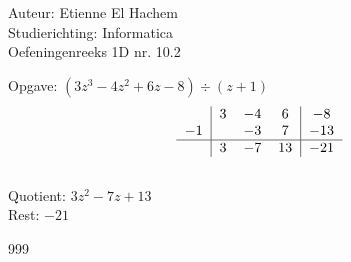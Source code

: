 \documentclass[a4paper]{article}
\begin{document}
  
\noindent \large Auteur: Etienne El Hachem \\
\noindent \large Studierichting: Informatica\\
\noindent \large Oefeningenreeks 1D nr. 10.2\\

\medskip

\normalsize

Opgave: $(3z^3 - 4z^2 + 6z - 8) \div (z + 1)$ \\

\[
\begin{tabular}{c|c c c|c}
& $3$ & $-4$ & $6$ & $-8$ \\

$-1$ & & $-3$ & $7$ & $-13$ \\ \hline

& $3$ & $-7$ & $13$ & $-21$
\end{tabular}
\] \\

Quotient: $3z^2 - 7z + 13$ \\

Rest: $-21$

\begin{thebibliography}{999}
\end{thebibliography}
\end{document}
